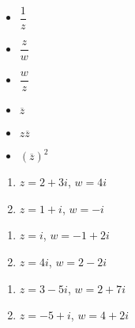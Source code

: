 \documentclass[11pt]{article}
\theoremstyle{definition}  %
\newcounter{HW}
\begin{document}
\begin{multicols}{3}

\begin{itemize}

\item $\dfrac{1}{z}$
\item $\dfrac{z}{w}$
\item $\dfrac{w}{z}$

\end{itemize}

\end{multicols}

\begin{multicols}{3}

\begin{itemize}

\item $\overline{z}$
\item $z\overline{z}$
\item $(\overline{z})^2$

\end{itemize}

\end{multicols}

\begin{multicols}{2}
\begin{enumerate}

\item  $z = 2+3i$, $w = 4i$ \label{compnumbasicfirst}
\item  $z = 1+i$, $w = -i$

\setcounter{HW}{\value{enumi}}
\end{enumerate}
\end{multicols}

\begin{multicols}{2}
\begin{enumerate}
\setcounter{enumi}{\value{HW}}

\item  $z = i$, $w = -1+2i$
\item  $z = 4i$, $w = 2-2i$

\setcounter{HW}{\value{enumi}}
\end{enumerate}
\end{multicols}

\begin{multicols}{2}
\begin{enumerate}
\setcounter{enumi}{\value{HW}}

\item  $z = 3-5i$, $w = 2+7i$
\item  $z = -5+i$, $w = 4+2i$

\setcounter{HW}{\value{enumi}}
\end{enumerate}
\end{multicols}
\end{document}
